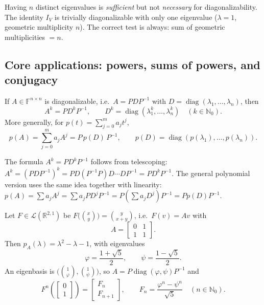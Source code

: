 \begin{commonmistake}[title={Common Mistake: diagonalizability does not require distinct eigenvalues}]
Having $n$ distinct eigenvalues is \emph{sufficient} but not \emph{necessary} for diagonalizability.
The identity $I_V$ is trivially diagonalizable with only one eigenvalue ($\lambda=1$, geometric multiplicity $n$).
The correct test is always: sum of geometric multiplicities $= n$.
\end{commonmistake}

\subsection{Core applications: powers, sums of powers, and conjugacy}

\begin{keyformula}[title={Key Formula: powers via diagonalization}]
If $A\in\mathbb{F}^{n\times n}$ is diagonalizable, i.e.\ $A=PDP^{-1}$ with $D=\operatorname{diag}(\lambda_1,\dots,\lambda_n)$, then
\[
A^k=PD^kP^{-1},\qquad D^k=\operatorname{diag}(\lambda_1^k,\dots,\lambda_n^k)\quad(k\in\mathbb{N}_0).
\]
More generally, for $p(t)=\sum_{j=0}^m a_j t^j$,
\[
p(A)=\sum_{j=0}^m a_j A^j = P\,p(D)\,P^{-1},\qquad p(D)=\operatorname{diag}(p(\lambda_1),\dots,p(\lambda_n)).
\]
\end{keyformula}

The formula $A^k=PD^kP^{-1}$ follows from telescoping: $A^k=(PDP^{-1})^k=PD(P^{-1}P)D\cdots DP^{-1}=PD^kP^{-1}$.
The general polynomial version uses the same idea together with linearity: $p(A)=\sum a_j A^j = \sum a_j PD^jP^{-1} = P(\sum a_j D^j)P^{-1}=Pp(D)P^{-1}$.

\begin{examplebox}[title={Worked Example (Tutorial 8, Question 1): Fibonacci via diagonalization}]
Let $F\in\mathcal{L}(\mathbb{R}^{2,1})$ be $F\bigl(\binom{x}{y}\bigr)=\binom{y}{x+y}$, i.e.\ $F(v)=Av$ with
\[
A=\begin{bmatrix}0&1\\1&1\end{bmatrix}.
\]
Then $p_A(\lambda)=\lambda^2-\lambda-1$, with eigenvalues
\[
\varphi=\frac{1+\sqrt{5}}{2},\qquad \psi=\frac{1-\sqrt{5}}{2}.
\]
An eigenbasis is $\bigl(\binom{1}{\varphi},\binom{1}{\psi}\bigr)$, so $A=P\operatorname{diag}(\varphi,\psi)P^{-1}$ and
\[
F^n\!\left(\begin{bmatrix}0\\1\end{bmatrix}\right)
=
\begin{bmatrix}F_n\\F_{n+1}\end{bmatrix},
\qquad
F_n=\frac{\varphi^n-\psi^n}{\sqrt{5}}\quad(n\in\mathbb{N}_0).
\]
\end{examplebox}

